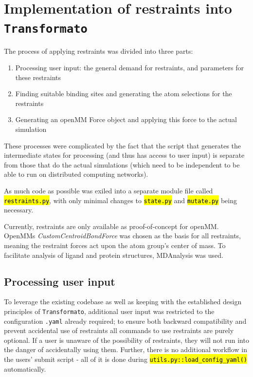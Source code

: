 \documentclass[oneside]{scrreprt}
\newcommand{\code}[1]{\texttt{\hl{#1}}}
\begin{document}
\section{Implementation of restraints into \texttt{Transformato}}

The process of applying restraints was divided into three parts:

\begin{enumerate}
    \item Processing user input: the general demand for restraints, and parameters for these restraints
    \item Finding suitable binding sites and generating the atom selections for the restraints
    \item Generating an openMM Force object and applying this force to the actual simulation

\end{enumerate}

These processes were complicated by the fact that the script that generates the intermediate states for processing (and thus has access to user input) is separate from those that do the actual simulations (which need to be independent to be able to run on distributed computing networks).



 As much code as possible was exiled into a separate module file called \code{restraints.py}, with only minimal changes to \code{state.py} and \code{mutate.py} being necessary. 

Currently, restraints are only available as proof-of-concept for openMM. OpenMMs \emph{CustomCentroidBondForce} was chosen as the basis for all restraints, meaning the restraint forces act upon the atom group's center of mass. To facilitate analysis of ligand and protein structures, MDAnalysis\cite{agrawal2011,oliver_beckstein-proc-scipy-2016} was used.

\subsection{Processing user input}
To leverage the existing codebase as well as keeping with the established design principles of \texttt{Transformato}, additional user input was restricted to the configuration \texttt{.yaml} already required; to ensure both backward compatibility and prevent accidental use of restraints all commands to use restraints are purely optional. If a user is unaware of the possibility of restraints, they will not run into the danger of accidentally using them. Further, there is no additional workflow in the users' submit script - all of it is done during \code{utils.py::load\_config\_yaml()} automatically.
\end{document}
